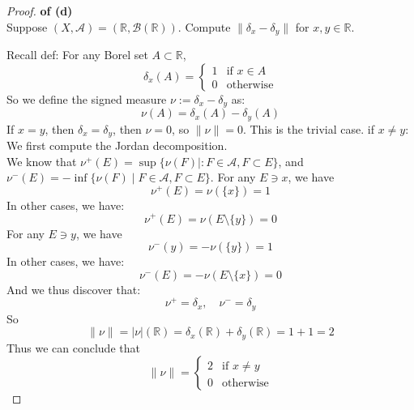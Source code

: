 \documentclass[lang=cn,11pt]{elegantbook}
\begin{document}
\begin{proof}
    \textbf{of (d)}\\
    Suppose $(X,\mathcal{A})=(\mathbb{R},\mathcal{B}(\mathbb{R}))$. Compute $\|\delta_x-\delta_y\|$ for $x,y\in\mathbb{R}$.

    
Recall def: For any Borel set \(A \subset \mathbb{R}\), \[
\delta_x(A) = \begin{cases}
1 & \text{if } x \in A \\
0 & \text{otherwise}
\end{cases}
\]
So we define the signed measure \(\nu := \delta_x - \delta_y\) as:
\[
\nu(A) = \delta_x(A) - \delta_y(A)
\]
If \(x = y\), then \(\delta_x = \delta_y \), then \(\nu = 0\), so \( \| \nu \|= 0  \). This is the trivial case.
if \(x \ne y\): We first compute the Jordan decomposition.\\
We know that $\nu^+(E)= \sup\{ \nu(F)\mid: F\in \mathcal{A}, F\subset E\}$, and  $\nu^-(E)= -  \inf\{ \nu(F)\mid  F\in \mathcal{A}, F\subset E\}$.
For any $E \ni x$, we have \[
\nu^+ (E)  = \nu  (\{x \}) = 1
\]
In other cases, we have: \[
\nu^+ (E)  = \nu  (E \setminus \{y \}) = 0 
\]
For any $E\ni y$, we have  \[
\nu^- (y)  = -\nu  (\{y \}) = 1
\]
In other cases, we have: \[
\nu^- (E)  = -\nu  (E \setminus \{x \}) = 0 
\]
And we thus discover that: \[
\nu^+ = \delta_x, \quad \nu^- = \delta_y
\]
So \[
\|\nu \| = |\nu| (\mathbb{R}) = \delta_x(\mathbb{R}) + \delta_y(\mathbb{R}) = 1 + 1 = 2
\]
Thus we can conclude that \[\|\nu \| = 
\begin{cases}
    2 & \text{if } x \not= y\\
0 & \text{otherwise}
\end{cases}
\]
\end{proof}
\end{document}
